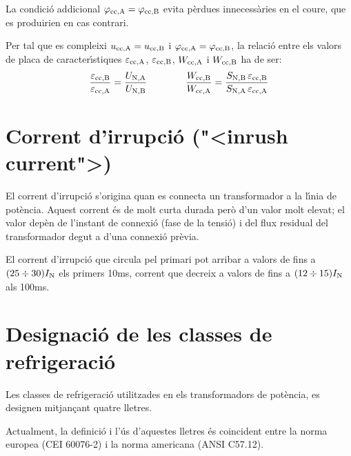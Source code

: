 La condici\'{o} addicional $\varphi_\mathrm{cc,A} =\varphi_\mathrm{cc,B}$ evita p\`{e}rdues innecess\`{a}ries en el coure, que es produirien en cas contrari.

Per tal que es compleixi $u_\mathrm{cc,A} = u_\mathrm{cc,B} $ i $\varphi_\mathrm{cc,A} =\varphi_\mathrm{cc,B}$, la relaci\'{o} entre els valors de placa de caracter\'{\i}stiques $\varepsilon_\mathrm{cc,A}$, $\varepsilon_\mathrm{cc,B}$, $W_\mathrm{cc,A}$ i $W_\mathrm{cc,B}$ ha de ser:
\begin{equation}
    \frac{\varepsilon_\mathrm{cc,B}}{\varepsilon_\mathrm{cc,A}} = \frac{U_\mathrm{N,A}}{U_\mathrm{N,B}} \qquad\qquad
    \frac{W_\mathrm{cc,B}}{W_\mathrm{cc,A}} = \frac{S_\mathrm{N,B} \,\varepsilon_\mathrm{cc,B}}{S_\mathrm{N,A}\, \varepsilon_\mathrm{cc,A}}
\end{equation}

\section{Corrent d'irrupci\'{o} ({"<}inrush current{">})}

El corrent d'irrupci\'{o} s'origina quan es  connecta un transformador a la l\'{\i}nia de pot\`{e}ncia. Aquest corrent \'{e}s de molt curta durada per\`{o} d'un valor molt elevat; el valor dep\`{e}n de l'instant de connexi\'{o} (fase de la tensi\'{o}) i del flux residual del transformador degut a d'una connexi\'{o} pr\`{e}via.

El corrent d'irrupci\'{o} que circula pel primari pot arribar a valors de fins a $(25\div 30) I_\mathrm{N}$ els primers 10\unit{ms}, corrent que decreix a valors de fins  a $(12\div 15) I_\mathrm{N}$ als 100\unit{ms}.

\section{Designaci\'{o} de les classes de refrigeraci\'{o}}
 

Les classes de refrigeraci\'{o} utilitzades en els transformadors de
pot\`{e}ncia, es designen mitjan\c{c}ant quatre lletres.

Actualment, la definici\'{o} i l'\'{u}s d'aquestes lletres \'{e}s coincident
entre la norma europea (\textsf{CEI 60076-2}) i la norma americana
(\textsf{ANSI C57.12}).

